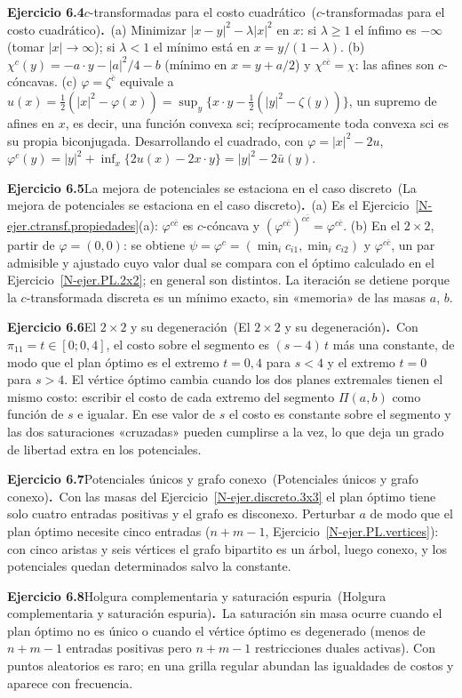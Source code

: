 \documentclass[11pt,a4paper]{amsart}
\theoremstyle{remark}
\theoremstyle{definition}
\numberwithin{subsection}{section}
\numberwithin{equation}{section}
\newcommand{\ejlabel}[2]{\par\medskip\noindent\textbf{Ejercicio #1}\ifx\relax#2\relax\else\ (#2)\fi\textbf{.}\ }
\begin{document}
\ejlabel{6.4}{$c$-transformadas para el costo cuadrático}(a) Minimizar $|x-y|^2-\lambda|x|^2$ en $x$: si $\lambda\ge1$ el ínfimo es $-\infty$ (tomar $|x|\to\infty$); si $\lambda<1$ el mínimo está en $x=y/(1-\lambda)$. (b) $\chi^c(y)=-a\cdot y-|a|^2/4-b$ (mínimo en $x=y+a/2$) y $\chi^{c\bar c}=\chi$: las afines son $c$-cóncavas. (c) $\varphi=\zeta^{\bar c}$ equivale a $u(x)=\frac12(|x|^2-\varphi(x))=\sup_y\{x\cdot y-\frac12(|y|^2-\zeta(y))\}$, un supremo de afines en $x$, es decir, una función convexa sci; recíprocamente toda convexa sci es su propia biconjugada. Desarrollando el cuadrado, con $\varphi=|x|^2-2u$, $\varphi^c(y)=|y|^2+\inf_x\{2u(x)-2x\cdot y\}=|y|^2-2\bar u(y)$.

\ejlabel{6.5}{La mejora de potenciales se estaciona en el caso discreto}(a) Es el Ejercicio~\ref{N-ejer.ctransf.propiedades}(a): $\varphi^{c\bar c}$ es $c$-cóncava y $(\varphi^{c\bar c})^{c\bar c}=\varphi^{c\bar c}$. (b) En el $2\times2$, partir de $\varphi=(0,0)$: se obtiene $\psi=\varphi^c=(\min_ic_{i1},\min_ic_{i2})$ y $\varphi^{c\bar c}$, un par admisible y ajustado cuyo valor dual se compara con el óptimo calculado en el Ejercicio~\ref{N-ejer.PL.2x2}; en general son distintos. La iteración se detiene porque la $c$-transformada discreta es un mínimo exacto, sin «memoria» de las masas $a$, $b$.

\ejlabel{6.6}{El $2\times2$ y su degeneración}Con $\pi_{11}=t\in[0;0{,}4]$, el costo sobre el segmento es $(s-4)\,t$ más una constante, de modo que el plan óptimo es el extremo $t=0{,}4$ para $s<4$ y el extremo $t=0$ para $s>4$. El vértice óptimo cambia cuando los dos planes extremales tienen el mismo costo: escribir el costo de cada extremo del segmento $\Pi(a,b)$ como función de $s$ e igualar. En ese valor de $s$ el costo es constante sobre el segmento y las dos saturaciones «cruzadas» pueden cumplirse a la vez, lo que deja un grado de libertad extra en los potenciales.

\ejlabel{6.7}{Potenciales únicos y grafo conexo}Con las masas del Ejercicio~\ref{N-ejer.discreto.3x3} el plan óptimo tiene solo cuatro entradas positivas y el grafo es disconexo. Perturbar $a$ de modo que el plan óptimo necesite cinco entradas ($n+m-1$, Ejercicio~\ref{N-ejer.PL.vertices}): con cinco aristas y seis vértices el grafo bipartito es un árbol, luego conexo, y los potenciales quedan determinados salvo la constante.

\ejlabel{6.8}{Holgura complementaria y saturación espuria}La saturación sin masa ocurre cuando el plan óptimo no es único o cuando el vértice óptimo es degenerado (menos de $n+m-1$ entradas positivas pero $n+m-1$ restricciones duales activas). Con puntos aleatorios es raro; en una grilla regular abundan las igualdades de costos y aparece con frecuencia.
\end{document}
